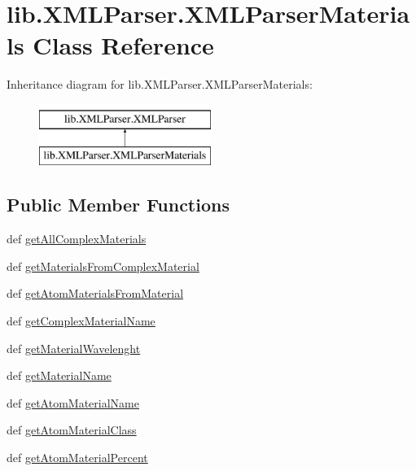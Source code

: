 \hypertarget{classlib_1_1_x_m_l_parser_1_1_x_m_l_parser_materials}{\section{lib.\-X\-M\-L\-Parser.\-X\-M\-L\-Parser\-Materials Class Reference}
\label{classlib_1_1_x_m_l_parser_1_1_x_m_l_parser_materials}
}
Inheritance diagram for lib.\-X\-M\-L\-Parser.\-X\-M\-L\-Parser\-Materials\-:\begin{figure}[H]
\begin{center}
\leavevmode
\includegraphics[height=2.000000cm]{classlib_1_1_x_m_l_parser_1_1_x_m_l_parser_materials}
\end{center}
\end{figure}
\subsection*{Public Member Functions}
\begin{DoxyCompactItemize}
\item 
def \hyperlink{classlib_1_1_x_m_l_parser_1_1_x_m_l_parser_materials_ab3cfa188f9eed4e2840f268c021e634d}{get\-All\-Complex\-Materials}
\item 
def \hyperlink{classlib_1_1_x_m_l_parser_1_1_x_m_l_parser_materials_aacaa1991f541945e4b5b64364caaf229}{get\-Materials\-From\-Complex\-Material}
\item 
def \hyperlink{classlib_1_1_x_m_l_parser_1_1_x_m_l_parser_materials_a8e2897a6e77a40e1976569286671e979}{get\-Atom\-Materials\-From\-Material}
\item 
def \hyperlink{classlib_1_1_x_m_l_parser_1_1_x_m_l_parser_materials_a27c1782cf67052f15ecfb169e3e7c06a}{get\-Complex\-Material\-Name}
\item 
def \hyperlink{classlib_1_1_x_m_l_parser_1_1_x_m_l_parser_materials_ace3edf29bf2667a08a95cc9a8a79fd5e}{get\-Material\-Wavelenght}
\item 
def \hyperlink{classlib_1_1_x_m_l_parser_1_1_x_m_l_parser_materials_ae891fb128b8286f02b58e8b257658a40}{get\-Material\-Name}
\item 
def \hyperlink{classlib_1_1_x_m_l_parser_1_1_x_m_l_parser_materials_a2b3a728b50d414346ab221a426486c73}{get\-Atom\-Material\-Name}
\item 
def \hyperlink{classlib_1_1_x_m_l_parser_1_1_x_m_l_parser_materials_a99c42de721948e39109a5a0bdbbd90c4}{get\-Atom\-Material\-Class}
\item 
def \hyperlink{classlib_1_1_x_m_l_parser_1_1_x_m_l_parser_materials_a029effe082ff3db1be165ab3f03aaead}{get\-Atom\-Material\-Percent}
\end{DoxyCompactItemize}
